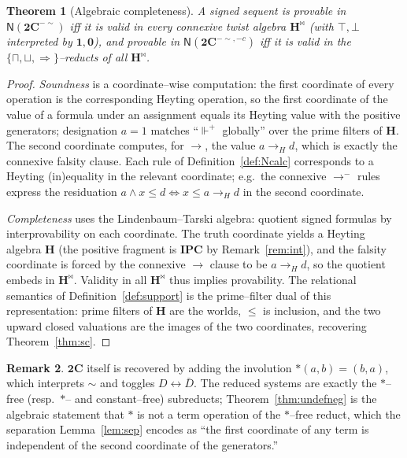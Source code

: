 \documentclass{amsart}
\theoremstyle{plain}
\newtheorem{theorem}{Theorem}
\theoremstyle{definition}
\newtheorem{remark}[theorem]{Remark}
\newcommand{\To}{\rightarrow}
\newcommand{\bigC}{\mathbf{2C}}
\newcommand{\Ci}{\mathbf{2C}^{-{\sim}}}        %
\newcommand{\Cii}{\mathbf{2C}^{-{\sim},-c}}    %
\newcommand{\fp}{\Vdash^{+}}
\begin{document}
\begin{theorem}[Algebraic completeness]\label{thm:algcompl}
A signed sequent is provable in $\mathsf{N}(\Ci)$ iff it is valid in every
connexive twist algebra $\mathbf H^{\bowtie}$ (with $\top,\bot$ interpreted by
$\mathbf 1,\mathbf 0$), and provable in $\mathsf{N}(\Cii)$ iff it is valid in the
$\{\sqcap,\sqcup,\Rightarrow\}$--reducts of all $\mathbf H^{\bowtie}$.
\end{theorem}
\begin{proof}
\emph{Soundness} is a coordinate--wise computation: the first coordinate of every
operation is the corresponding Heyting operation, so the first coordinate of the
value of a formula under an assignment equals its Heyting value with the positive
generators; designation $a=1$ matches ``$\fp$ globally'' over the prime filters
of $\mathbf H$. The second coordinate computes, for $\To$, the value $a\To_H d$,
which is exactly the connexive falsity clause. Each rule of
Definition~\ref{def:Ncalc} corresponds to a Heyting (in)equality in the relevant
coordinate; e.g.\ the connexive $\To^{-}$ rules express the residuation
$a\wedge x\le d\iff x\le a\To_H d$ in the second coordinate.

\emph{Completeness} uses the Lindenbaum--Tarski algebra: quotient signed formulas
by interprovability on each coordinate. The truth coordinate yields a Heyting
algebra $\mathbf H$ (the positive fragment is $\mathbf{IPC}$ by
Remark~\ref{rem:int}), and the falsity coordinate is forced by the connexive
$\To$ clause to be $a\To_H d$, so the quotient embeds in $\mathbf
H^{\bowtie}$. Validity in all $\mathbf H^{\bowtie}$ thus implies provability. The
relational semantics of Definition~\ref{def:support} is the prime--filter dual of
this representation: prime filters of $\mathbf H$ are the worlds, $\le$ is
inclusion, and the two upward closed valuations are the images of the two
coordinates, recovering Theorem~\ref{thm:sc}.
\end{proof}

\begin{remark}
$\bigC$ itself is recovered by adding the involution $\ast(a,b)=(b,a)$, which
interprets ${\sim}$ and toggles $D\leftrightarrow\bar D$. The reduced systems are
exactly the $\ast$--free (resp.\ $\ast$-- and constant--free) subreducts;
Theorem~\ref{thm:undefneg} is the algebraic statement that $\ast$ is not a term
operation of the $\ast$--free reduct, which the separation
Lemma~\ref{lem:sep} encodes as ``the first coordinate of any term is independent
of the second coordinate of the generators.''
\end{remark}
\end{document}
